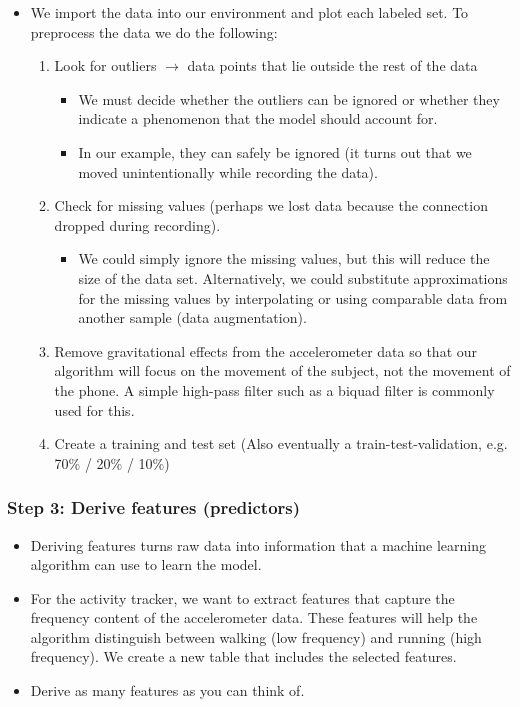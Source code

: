 \documentclass[a4paper]{article}
\begin{document}
			\begin{itemize}
				\item We import the data into our environment and plot each labeled set.	
					To preprocess the data we do the following:
					\begin{enumerate}
						\item Look for outliers $\rightarrow$ data points that lie outside the rest of the data
							\begin{itemize}
								\item We must decide whether the outliers can be ignored or whether they indicate a phenomenon that the model should account for.
								\item In our example, they can safely be ignored (it turns out that we moved unintentionally while recording the data).
							\end{itemize}
						\item Check for missing values (perhaps we lost data because the connection dropped during recording).
							\begin{itemize}
								\item We could simply ignore the missing values, but this will reduce the size of the data set.
									Alternatively, we could substitute approximations for the missing values by interpolating or using comparable data from another sample (data augmentation).
							\end{itemize}
						\item Remove gravitational effects from the accelerometer data so that our algorithm will focus on the movement of the subject, not the movement of the phone.
							A simple high-pass filter such as a biquad filter is commonly used for this.
						\item Create a training and test set (Also eventually a train-test-validation, e.g. 70\% / 20\% / 10\%)
					\end{enumerate}
			\end{itemize}
			
			\subsubsection{Step 3: Derive features (predictors)}
			
			\begin{itemize}
				\item Deriving features turns raw data into information that a machine learning algorithm can use to learn the model.
				\item For the activity tracker, we want to extract features that capture the frequency content of the accelerometer data.
					These features will help the algorithm distinguish between walking (low frequency) and running (high frequency).
					We create a new table that includes the selected features.
				\item Derive as many features as you can think of.
			\end{itemize}
		
\end{document}
